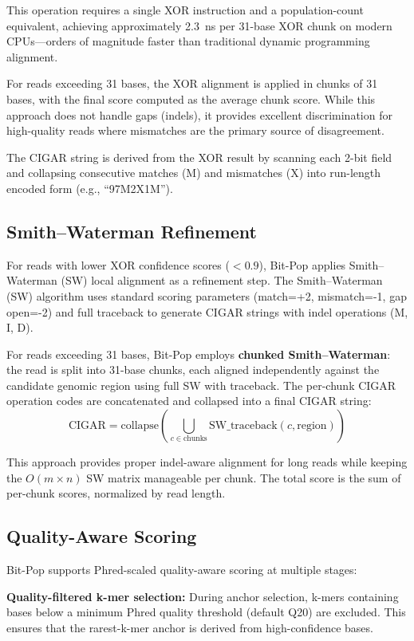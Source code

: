 \documentclass[10pt]{article}
\begin{document}
This operation requires a single XOR instruction and a population-count equivalent, achieving approximately 2.3~ns per 31-base XOR chunk on modern CPUs---orders of magnitude faster than traditional dynamic programming alignment.

For reads exceeding 31 bases, the XOR alignment is applied in chunks of 31 bases, with the final score computed as the average chunk score. While this approach does not handle gaps (indels), it provides excellent discrimination for high-quality reads where mismatches are the primary source of disagreement.

The CIGAR string is derived from the XOR result by scanning each 2-bit field and collapsing consecutive matches (M) and mismatches (X) into run-length encoded form (e.g., ``97M2X1M'').

\subsection{Smith--Waterman Refinement}

For reads with lower XOR confidence scores ($< 0.9$), Bit-Pop applies Smith--Waterman (SW) local alignment as a refinement step. The Smith--Waterman (SW) algorithm \citep{smith1981} uses standard scoring parameters (match=+2, mismatch=-1, gap open=-2) and full traceback to generate CIGAR strings with indel operations (M, I, D).

For reads exceeding 31 bases, Bit-Pop employs \textbf{chunked Smith--Waterman}: the read is split into 31-base chunks, each aligned independently against the candidate genomic region using full SW with traceback. The per-chunk CIGAR operation codes are concatenated and collapsed into a final CIGAR string:
\[
\text{CIGAR} = \text{collapse}\left(\bigcup_{c \in \text{chunks}} \text{SW\_traceback}(c, \text{region})\right)
\]

This approach provides proper indel-aware alignment for long reads while keeping the $O(m \times n)$ SW matrix manageable per chunk. The total score is the sum of per-chunk scores, normalized by read length.

\subsection{Quality-Aware Scoring}

Bit-Pop supports Phred-scaled quality-aware scoring at multiple stages:

\textbf{Quality-filtered k-mer selection:} During anchor selection, k-mers containing bases below a minimum Phred quality threshold (default Q20) \citep{edlin1998} are excluded. This ensures that the rarest-k-mer anchor is derived from high-confidence bases.
\end{document}
